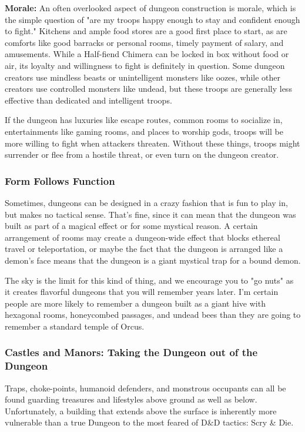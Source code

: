 \textbf{Morale:} An often overlooked aspect of dungeon construction is morale, which is the simple question of "are my troops happy enough to stay and confident enough to fight." Kitchens and ample food stores are a good first place to start, as are comforts like good barracks or personal rooms, timely payment of salary, and amusements. While a Half-fiend Chimera can be locked in box without food or air, its loyalty and willingness to fight is definitely in question. Some dungeon creators use mindless beasts or unintelligent monsters like oozes, while other creators use controlled monsters like undead, but these troops are generally less effective than dedicated and intelligent troops.

If the dungeon has luxuries like escape routes, common rooms to socialize in, entertainments like gaming rooms, and places to worship gods, troops will be more willing to fight when attackers threaten. Without these things, troops might surrender or flee from a hostile threat, or even turn on the dungeon creator.

\subsubsection{Form Follows Function}

Sometimes, dungeons can be designed in a crazy fashion that is fun to play in, but makes no tactical sense. That's fine, since it can mean that the dungeon was built as part of a magical effect or for some mystical reason. A certain arrangement of rooms may create a dungeon-wide effect that blocks ethereal travel or teleportation, or maybe the fact that the dungeon is arranged like a demon's face means that the dungeon is a giant mystical trap for a bound demon.

The sky is the limit for this kind of thing, and we encourage you to "go nuts" as it creates flavorful dungeons that you will remember years later. I'm certain people are more likely to remember a dungeon built as a giant hive with hexagonal rooms, honeycombed passages, and undead bees than they are going to remember a standard temple of Orcus.

\subsubsection{Castles and Manors: Taking the Dungeon out of the Dungeon}

Traps, choke-points, humanoid defenders, and monstrous occupants can all be found guarding treasures and lifestyles above ground as well as below. Unfortunately, a building that extends above the surface is inherently more vulnerable than a true Dungeon to the most feared of D\&D tactics: Scry \& Die.

